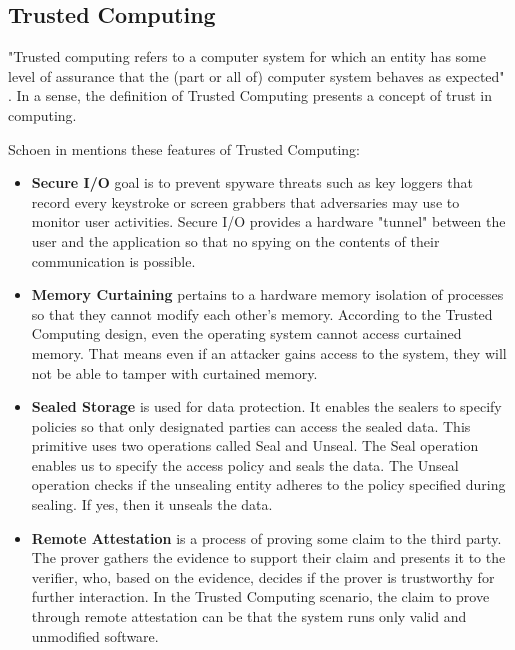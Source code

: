 \subsection{Trusted Computing}\label{sec:tc}
"Trusted computing refers to a computer system for which an entity has some level of assurance that the (part or all of) computer system behaves as expected" \cite{mitchell2005trusted}. In a sense, the definition of Trusted Computing presents a concept of trust in computing.

Schoen in \cite{schoen2003trusted} mentions these features of Trusted Computing:

\begin{itemize}


\item \textbf{Secure I/O} goal is to prevent spyware threats such as key loggers that record every keystroke or screen grabbers that adversaries may use to monitor user activities. Secure I/O provides a hardware "tunnel" between the user and the application so that no spying on the contents of their communication is possible.

\item \textbf{Memory Curtaining} pertains to a hardware memory isolation of processes so that they cannot modify each other's memory. According to the Trusted Computing design, even the operating system cannot access curtained memory. That means even if an attacker gains access to the system, they will not be able to tamper with curtained memory.

\item \textbf{Sealed Storage} is used for data protection. It enables the sealers to specify policies so that only designated parties can access the sealed data. This primitive uses two operations called Seal and Unseal. The Seal operation enables us to specify the access policy and seals the data. The Unseal operation checks if the unsealing entity adheres to the policy specified during sealing. If yes, then it unseals the data.

\item \textbf{Remote Attestation} is a process of proving some claim to the third party. The prover gathers the evidence to support their claim and presents it to the verifier, who, based on the evidence, decides if the prover is trustworthy for further interaction. In the Trusted Computing scenario, the claim to prove through remote attestation can be that the system runs only valid and unmodified software. 
\end{itemize}


